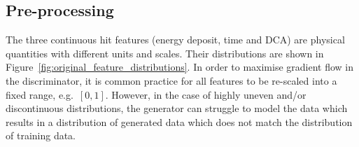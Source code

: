 




\subsection{Pre-processing}
The three continuous hit features (energy deposit, time and DCA) are physical
quantities with different units and scales. Their distributions are shown in
Figure~\ref{fig:original_feature_distributions}. In order to maximise gradient
flow in the discriminator, it is common practice for all features to be
re-scaled into a fixed range, e.g.\ $[0, 1]$. However, in the case of highly
uneven and/or discontinuous distributions, the generator can struggle to model
the data which results in a distribution of generated data which does not match
the distribution of training data.

